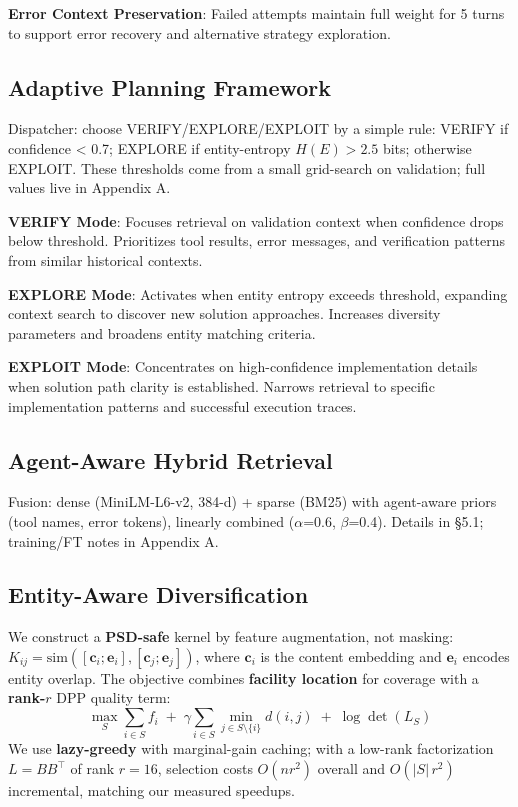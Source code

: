 \documentclass[letterpaper]{article}
\begin{document}
\textbf{Error Context Preservation}: Failed attempts maintain full weight for 5 turns to support error recovery and alternative strategy exploration.

\subsection{Adaptive Planning Framework}

Dispatcher: choose VERIFY/EXPLORE/EXPLOIT by a simple rule: VERIFY if confidence < 0.7; EXPLORE if entity-entropy $H(E)>2.5$ bits; otherwise EXPLOIT. These thresholds come from a small grid-search on validation; full values live in Appendix A.

\textbf{VERIFY Mode}: Focuses retrieval on validation context when confidence drops below threshold. Prioritizes tool results, error messages, and verification patterns from similar historical contexts.

\textbf{EXPLORE Mode}: Activates when entity entropy exceeds threshold, expanding context search to discover new solution approaches. Increases diversity parameters and broadens entity matching criteria.

\textbf{EXPLOIT Mode}: Concentrates on high-confidence implementation details when solution path clarity is established. Narrows retrieval to specific implementation patterns and successful execution traces.

\subsection{Agent-Aware Hybrid Retrieval}

Fusion: dense (MiniLM-L6-v2, 384-d) + sparse (BM25) with agent-aware priors (tool names, error tokens), linearly combined ($\alpha$=0.6, $\beta$=0.4). Details in §5.1; training/FT notes in Appendix A.

\subsection{Entity-Aware Diversification}

We construct a \textbf{PSD-safe} kernel by feature augmentation, not masking:
$K_{ij} = \mathrm{sim}([\mathbf{c}_i;\mathbf{e}_i], [\mathbf{c}_j;\mathbf{e}_j])$,
where $\mathbf{c}_i$ is the content embedding and $\mathbf{e}_i$ encodes entity overlap. The objective combines \textbf{facility location} for coverage with a \textbf{rank-$r$} DPP quality term:
$$\displaystyle \max_{S} \sum_{i\in S} f_i \;+\; \gamma\!\sum_{i\in S}\min_{j\in S\setminus\{i\}} d(i,j)\;+\;\log\det(L_S)$$
We use \textbf{lazy-greedy} with marginal-gain caching; with a low-rank factorization $L = BB^\top$ of rank $r=16$, selection costs \textbf{$O(nr^2)$} overall and \textbf{$O(|S|\,r^2)$} incremental, matching our measured speedups.
\end{document}
